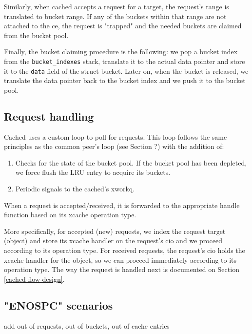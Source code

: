 Similarly, when cached accepts a request for a target, the request's range is 
translated to bucket range. If any of the buckets within that range are not 
attached to the ce, the request is "trapped" and the needed buckets are claimed 
from the bucket pool.

Finally, the bucket claiming procedure is the following: we pop a bucket index 
from the \texttt{bucket\_indexes} stack, translate it to the actual data 
pointer and store it to the \texttt{data} field of the struct bucket. Later on, 
when the bucket is released, we translate the data pointer back to the bucket 
index and we push it to the bucket pool.

\subsection{Request handling}

Cached uses a custom loop to poll for requests. This loop follows the same 
principles as the common peer's loop (see Section ?) with the addition of:

\begin{enumerate}
	\item Checks for the state of the bucket pool. If the bucket pool has 
		been depleted, we force flush the LRU entry to acquire its 
		buckets.
	\item Periodic signals to the cached's xworkq.
\end{enumerate}

When a request is accepted/received, it is forwarded to the appropriate handle 
function based on its xcache operation type.

More specifically, for accepted (new) requests, we index the request target 
(object) and store its xcache handler on the request's cio and we proceed 
according to its operation type. For received requests, the request's cio holds 
the xcache handler for the object, so we can proceed immediately according to 
its operation type. The way the request is handled next is documented on 
Section \ref{cached-flow-design}.

\subsection{"ENOSPC" scenarios}

\fixme add out of requests, out of buckets, out of cache entries
